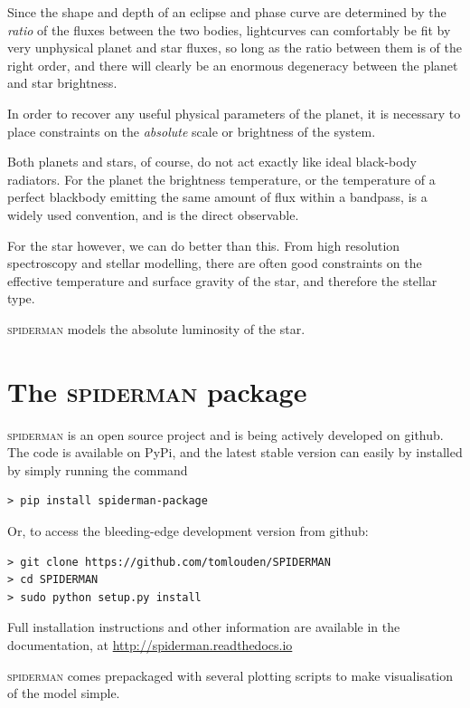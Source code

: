\documentclass[a4paper,fleqn,usenatbib]{mnras}
\begin{document}
Since the shape and depth of an eclipse and phase curve are determined by the \emph{ratio} of the fluxes between the two bodies, lightcurves can comfortably be fit by very unphysical planet and star fluxes, so long as the ratio between them is of the right order, and there will clearly be an enormous degeneracy between the planet and star brightness.

In order to recover any useful physical parameters of the planet, it is necessary to place constraints on the \emph{absolute} scale or brightness of the system.

Both planets and stars, of course, do not act exactly like ideal black-body radiators. For the planet the brightness temperature, or the temperature of a perfect blackbody emitting the same amount of flux within a bandpass, is a widely used convention, and is the direct observable.

For the star however, we can do better than this. From high resolution spectroscopy and stellar modelling, there are often good constraints on the effective temperature and surface gravity of the star, and therefore the stellar type.

\textsc{spiderman} models the absolute luminosity of the star.

\section{The \textsc{spiderman} package}\label{sec:package}

\textsc{spiderman} is an open source project and is being actively developed on github. The code is available on PyPi, and the latest stable version can easily by installed by simply running the command 

\begin{Verbatim}[frame=single]
> pip install spiderman-package
\end{Verbatim}

Or, to access the bleeding-edge development version from github:

\begin{Verbatim}[frame=single]
> git clone https://github.com/tomlouden/SPIDERMAN
> cd SPIDERMAN
> sudo python setup.py install
\end{Verbatim}

Full installation instructions and other information are available in the documentation, at \url{http://spiderman.readthedocs.io}

\textsc{spiderman} comes prepackaged with several plotting scripts to make visualisation of the model simple.
\end{document}
